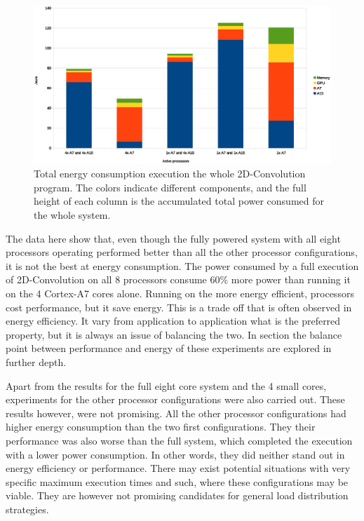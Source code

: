 \begin{figure}[H]
  \centering
  \includegraphics[width=160mm]{fig/power-consumed-configurations.eps}
  \caption{Total energy consumption execution the whole 2D-Convolution program. The colors indicate different components, and the full height of each column is the accumulated total power consumed for the whole system.\label{overflow}} \label {power-consumed-configurations}
\end{figure}

The data here show that, even though the fully powered system with all eight processors operating performed better than all the other processor configurations, it is not the best at energy consumption.
The power consumed by a full execution of 2D-Convolution on all 8 processors consume 60\% more power than running it on the 4 Cortex-A7 cores alone.
Running on the more energy efficient, processors cost performance, but it save energy.
This is a trade off that is often observed in energy efficiency.
It vary from application to application what is the preferred property, but it is always an issue of balancing the two.
In section  the balance point between performance and energy of these experiments are explored in further depth.

Apart from the results for the full eight core system and the 4 small cores, experiments for the other processor configurations were also carried out.
These results however, were not promising.
All the other processor configurations had higher energy consumption than the two first configurations.
They their performance was also worse than the full system, which completed the execution with a lower power consumption.
In other words, they did neither stand out in energy efficiency or performance.
There may exist potential situations with very specific maximum execution times and such, where these configurations may be viable.
They are however not promising candidates for general load distribution strategies.

